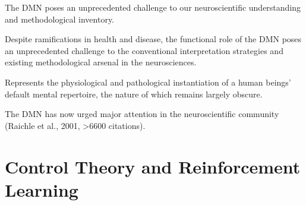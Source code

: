 \documentclass{article} %
\begin{document}
The DMN poses an unprecedented challenge to our neuroscientific understanding and methodological inventory.

Despite ramifications in health and disease, the functional role of the DMN poses an unprecedented challenge to the conventional interpretation strategies and existing methodological arsenal in the neurosciences.

Represents the physiological and pathological instantiation of a human beings' default mental repertoire, the nature of which remains largely obscure.

The DMN has now urged major attention in the neuroscientific community (Raichle et al., 2001, >6600 citations). 



\section{Control Theory and Reinforcement Learning}
\end{document}
